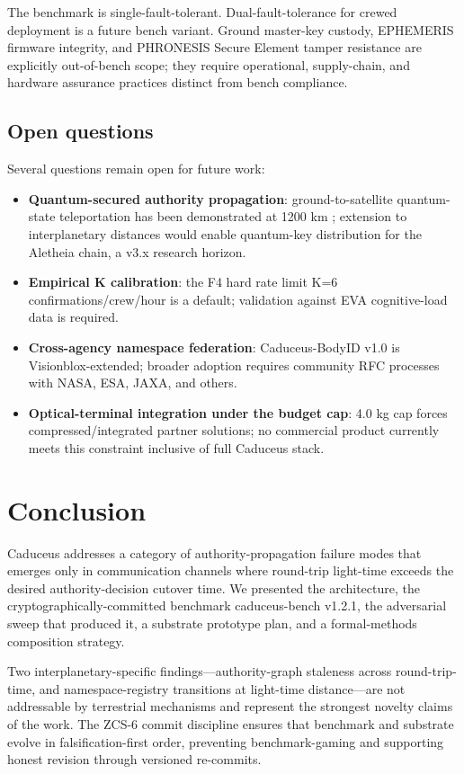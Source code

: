 \documentclass[conference]{IEEEtran}
\begin{document}
The benchmark is single-fault-tolerant. Dual-fault-tolerance for crewed deployment is a future bench variant. Ground master-key custody, EPHEMERIS firmware integrity, and PHRONESIS Secure Element tamper resistance are explicitly out-of-bench scope; they require operational, supply-chain, and hardware assurance practices distinct from bench compliance.

\subsection{Open questions}

Several questions remain open for future work:

\begin{itemize}
    \item \textbf{Quantum-secured authority propagation}: ground-to-satellite quantum-state teleportation has been demonstrated at 1200 km \cite{yin2017micius}; extension to interplanetary distances would enable quantum-key distribution for the Aletheia chain, a v3.x research horizon.
    \item \textbf{Empirical K calibration}: the F4 hard rate limit K=6 confirmations/crew/hour is a default; validation against EVA cognitive-load data is required.
    \item \textbf{Cross-agency namespace federation}: Caduceus-BodyID v1.0 is Visionblox-extended; broader adoption requires community RFC processes with NASA, ESA, JAXA, and others.
    \item \textbf{Optical-terminal integration under the budget cap}: 4.0 kg cap forces compressed/integrated partner solutions; no commercial product currently meets this constraint inclusive of full Caduceus stack.
\end{itemize}

\section{Conclusion}\label{sec:conclusion}

Caduceus addresses a category of authority-propagation failure modes that emerges only in communication channels where round-trip light-time exceeds the desired authority-decision cutover time. We presented the architecture, the cryptographically-committed benchmark caduceus-bench v1.2.1, the adversarial sweep that produced it, a substrate prototype plan, and a formal-methods composition strategy.

Two interplanetary-specific findings---authority-graph staleness across round-trip-time, and namespace-registry transitions at light-time distance---are not addressable by terrestrial mechanisms and represent the strongest novelty claims of the work. The ZCS-6 commit discipline ensures that benchmark and substrate evolve in falsification-first order, preventing benchmark-gaming and supporting honest revision through versioned re-commits.
\end{document}
